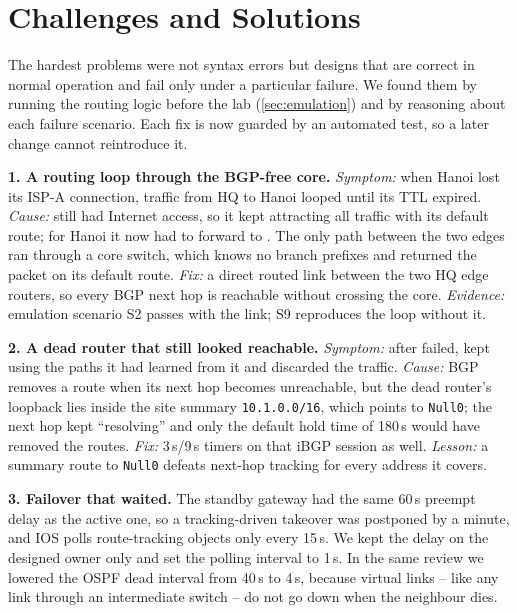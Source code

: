 \section{Challenges and Solutions}\label{sec:challenges}

The hardest problems were not syntax errors but designs that are correct in normal operation and fail
only under a particular failure. We found them by running the routing logic before the lab
(\cref{sec:emulation}) and by reasoning about each failure scenario. Each fix is now guarded by an
automated test, so a later change cannot reintroduce it.

\textbf{1. A routing loop through the BGP-free core.} \emph{Symptom:} when Hanoi lost its ISP-A connection,
traffic from HQ to Hanoi looped until its TTL expired. \emph{Cause:}  still had Internet
access, so it kept attracting all traffic with its default route; for Hanoi it now had to forward to
. The only path between the two edges ran through a core switch, which knows no branch
prefixes and returned the packet on its default route. \emph{Fix:} a direct routed link between the two HQ
edge routers, so every BGP next hop is reachable without crossing the core. \emph{Evidence:} emulation
scenario S2 passes with the link; S9 reproduces the loop without it.

\textbf{2. A dead router that still looked reachable.} \emph{Symptom:} after  failed,
 kept using the paths it had learned from it and discarded the traffic. \emph{Cause:} BGP
removes a route when its next hop becomes unreachable, but the dead router's loopback lies inside the site
summary \texttt{10.1.0.0/16}, which points to \texttt{Null0}; the next hop kept ``resolving'' and only the
default hold time of 180\,s would have removed the routes. \emph{Fix:} 3\,s/9\,s timers on that iBGP session
as well. \emph{Lesson:} a summary route to \texttt{Null0} defeats next-hop tracking for every address it
covers.

\textbf{3. Failover that waited.} The standby gateway had the same 60\,s preempt delay as the active one,
so a tracking-driven takeover was postponed by a minute, and IOS polls route-tracking objects only every 15\,s.
We kept the delay on the designed owner only and set the polling interval to 1\,s. In the same review we
lowered the OSPF dead interval from 40\,s to 4\,s, because virtual links -- like any link through an
intermediate switch -- do not go down when the neighbour dies.

